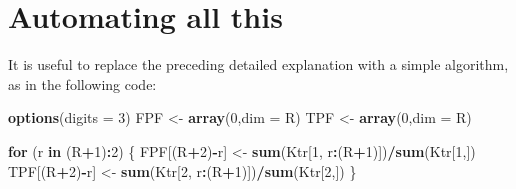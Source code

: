 \documentclass[
]{book}
\newenvironment{Shaded}{\begin{snugshade}}{\end{snugshade}}
\newcommand{\ControlFlowTok}[1]{\textcolor[rgb]{0.13,0.29,0.53}{\textbf{#1}}}
\newcommand{\DataTypeTok}[1]{\textcolor[rgb]{0.13,0.29,0.53}{#1}}
\newcommand{\DecValTok}[1]{\textcolor[rgb]{0.00,0.00,0.81}{#1}}
\newcommand{\KeywordTok}[1]{\textcolor[rgb]{0.13,0.29,0.53}{\textbf{#1}}}
\newcommand{\NormalTok}[1]{#1}
\newcommand{\OperatorTok}[1]{\textcolor[rgb]{0.81,0.36,0.00}{\textbf{#1}}}
\newcommand{\StringTok}[1]{\textcolor[rgb]{0.31,0.60,0.02}{#1}}
\begin{document}
\hypertarget{automating-all-this}{%
\section{Automating all this}\label{automating-all-this}}

It is useful to replace the preceding detailed explanation with a simple algorithm, as in the following code:

\begin{Shaded}
\begin{Highlighting}[]
\KeywordTok{options}\NormalTok{(}\DataTypeTok{digits =} \DecValTok{3}\NormalTok{)}
\NormalTok{FPF \textless{}{-}}\StringTok{ }\KeywordTok{array}\NormalTok{(}\DecValTok{0}\NormalTok{,}\DataTypeTok{dim =}\NormalTok{ R)}
\NormalTok{TPF \textless{}{-}}\StringTok{ }\KeywordTok{array}\NormalTok{(}\DecValTok{0}\NormalTok{,}\DataTypeTok{dim =}\NormalTok{ R)}

\ControlFlowTok{for}\NormalTok{ (r }\ControlFlowTok{in}\NormalTok{ (R}\OperatorTok{+}\DecValTok{1}\NormalTok{)}\OperatorTok{:}\DecValTok{2}\NormalTok{) \{}
\NormalTok{  FPF[(R}\OperatorTok{+}\DecValTok{2}\NormalTok{)}\OperatorTok{{-}}\NormalTok{r] \textless{}{-}}\StringTok{ }\KeywordTok{sum}\NormalTok{(Ktr[}\DecValTok{1}\NormalTok{, r}\OperatorTok{:}\NormalTok{(R}\OperatorTok{+}\DecValTok{1}\NormalTok{)])}\OperatorTok{/}\KeywordTok{sum}\NormalTok{(Ktr[}\DecValTok{1}\NormalTok{,])}
\NormalTok{  TPF[(R}\OperatorTok{+}\DecValTok{2}\NormalTok{)}\OperatorTok{{-}}\NormalTok{r] \textless{}{-}}\StringTok{ }\KeywordTok{sum}\NormalTok{(Ktr[}\DecValTok{2}\NormalTok{, r}\OperatorTok{:}\NormalTok{(R}\OperatorTok{+}\DecValTok{1}\NormalTok{)])}\OperatorTok{/}\KeywordTok{sum}\NormalTok{(Ktr[}\DecValTok{2}\NormalTok{,])    }
\NormalTok{\}}


\end{Highlighting}
\end{Shaded}
\end{document}
